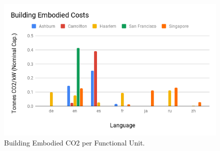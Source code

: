 \begin{figure}[h!]\centering
    \includegraphics[scale=0.65]{embodied_cost_model/images/Building Embodied Costs.png}
    \caption[Building Embodied CO2 per Functional Unit]{Building Embodied CO2 per Functional Unit.}
    \label{img: building_co2}
\end{figure}